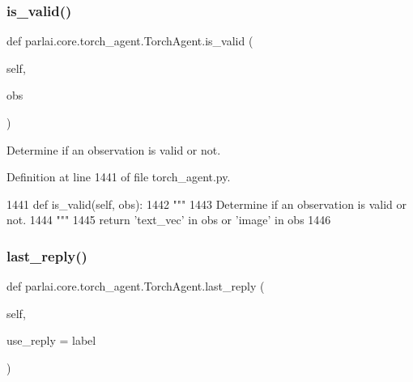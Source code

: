 \mbox{\label{classparlai_1_1core_1_1torch__agent_1_1TorchAgent_afa491bf2384b017711ad722b5341b405}} 
\subsubsection{\texorpdfstring{is\+\_\+valid()}{is\_valid()}}
{\footnotesize\ttfamily def parlai.\+core.\+torch\+\_\+agent.\+Torch\+Agent.\+is\+\_\+valid (\begin{DoxyParamCaption}\item[{}]{self,  }\item[{}]{obs }\end{DoxyParamCaption})}

\begin{DoxyVerb}Determine if an observation is valid or not.
\end{DoxyVerb}
 

Definition at line 1441 of file torch\+\_\+agent.\+py.


\begin{DoxyCode}
1441     \textcolor{keyword}{def }is\_valid(self, obs):
1442         \textcolor{stringliteral}{"""}
1443 \textcolor{stringliteral}{        Determine if an observation is valid or not.}
1444 \textcolor{stringliteral}{        """}
1445         \textcolor{keywordflow}{return} \textcolor{stringliteral}{'text\_vec'} \textcolor{keywordflow}{in} obs \textcolor{keywordflow}{or} \textcolor{stringliteral}{'image'} \textcolor{keywordflow}{in} obs
1446 
\end{DoxyCode}
\mbox{\label{classparlai_1_1core_1_1torch__agent_1_1TorchAgent_a32921aa09a682ee752d4822a5f5ebbb4}} 
\subsubsection{\texorpdfstring{last\+\_\+reply()}{last\_reply()}}
{\footnotesize\ttfamily def parlai.\+core.\+torch\+\_\+agent.\+Torch\+Agent.\+last\+\_\+reply (\begin{DoxyParamCaption}\item[{}]{self,  }\item[{}]{use\+\_\+reply = {\ttfamily \textquotesingle{}label\textquotesingle{}} }\end{DoxyParamCaption})}

